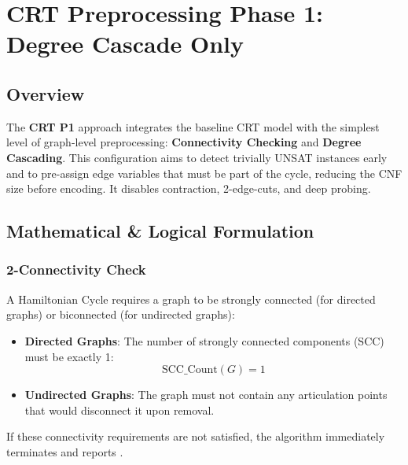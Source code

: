 \section{CRT Preprocessing Phase 1: Degree Cascade Only}
\label{sec:crt_p1_cascade}

\subsection{Overview}
The \textbf{CRT P1} approach integrates the baseline CRT model with the simplest level of graph-level preprocessing: \textbf{Connectivity Checking} and \textbf{Degree Cascading}.
This configuration aims to detect trivially UNSAT instances early and to pre-assign edge variables that must be part of the cycle, reducing the CNF size before encoding.
It disables contraction, 2-edge-cuts, and deep probing.

\subsection{Mathematical \& Logical Formulation}

\subsubsection{2-Connectivity Check}
A Hamiltonian Cycle requires a graph to be strongly connected (for directed graphs) or biconnected (for undirected graphs):
\begin{itemize}
    \item \textbf{Directed Graphs}: The number of strongly connected components (SCC) must be exactly 1:
    \begin{equation}
        \text{SCC\_Count}(G) = 1
    \end{equation}
    \item \textbf{Undirected Graphs}: The graph must not contain any articulation points that would disconnect it upon removal.
\end{itemize}
If these connectivity requirements are not satisfied, the algorithm immediately terminates and reports .

